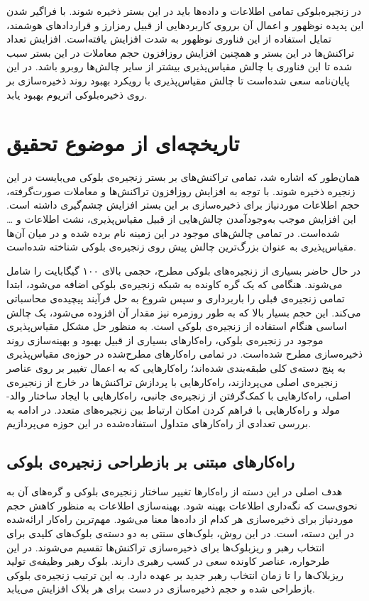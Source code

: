 در زنجیره‌بلوکی تمامی اطلاعات و داده‌ها باید در این بستر ذخیره شوند. با فراگیر شدن این پدیده نوظهور و اعمال آن برروی کاربردهایی از قبیل رمزارز و قراردادهای هوشمند، تمایل استفاده از این فناوری نوظهور به شدت افزایش یافته‌است. افزایش تعداد تراکنش‌ها در این بستر و همچنین افزایش روزافزون حجم معاملات در این بستر سبب شده تا این فناوری با چالش مقیاس‌پذیری بیشتر از سایر چالش‌ها روبرو باشد. در این پایان‌نامه سعی شده‌است تا چالش مقیاس‌پذیری با رویکرد بهبود روند ذخیره‌سازی بر روی ذخیره‌بلوکی اتریوم بهبود یابد.

\section{تاریخچه‌ای از موضوع تحقیق}
همان‌‌طور که اشاره شد، تمامی تراکنش‌های بر بستر زنجیره‌ی بلوکی می‌بایست در این زنجیره ذخیره شوند. با توجه به افزایش روزافزون تراکنش‌ها و معاملات صورت‌گرفته، حجم اطلاعات موردنیاز برای ذخیره‌سازی بر این بستر افزایش چشم‌گیری داشته است. این افزایش موجب به‌وجود‌آمدن چالش‌هایی از قبیل مقیاس‌پذیری، نشت اطلاعات و \dots شده‌است. در \cite{Lin2017}
تمامی چالش‌های موجود در این زمینه نام برده شده و در میان آن‌ها مقیاس‌پذیری به عنوان بزرگ‌ترین چالش پیش‌ روی زنجیر‌ه‌ی بلوکی شناخته شده‌است. 

در حال حاضر بسیاری از زنجیره‌های بلوکی مطرح، حجمی بالای ۱۰۰ گیگابایت را شامل می‌شوند. هنگامی که یک گره کاونده به شبکه زنجیره‌ی بلوکی اضافه می‌شود، ابتدا تمامی زنجیره‌ی قبلی را باربرداری و سپس شروع به حل فرآیند پیچیده‌ی محاسباتی می‌کند. این حجم بسیار بالا که به طور روزمره نیز مقدار آن افزوده می‌شود، یک چالش اساسی هنگام استفاده از زنجیره‌ی بلوکی است. \cite{Wang2018}
به منظور حل مشکل مقیاس‌پذیری موجود در زنجیره‌ی بلوکی، راه‌کارهای بسیاری از قبیل بهبود و بهینه‌سازی روند ذخیره‌سازی مطرح شده‌است.
در \cite{Kim2018} تمامی راه‌کارهای مطرح‌شده در حوزه‌ی مقیاس‌پذیری به پنج دسته‌ی کلی طبقه‌بندی شده‌اند؛ راه‌کارهایی که به اعمال تغییر بر روی عناصر زنجیره‌ی اصلی می‌پردازند، راه‌کارهایی با پردازش تراکنش‌ها در خارج از زنجیره‌ی اصلی، راه‌کارهایی با کمک‌گرفتن از زنجیره‌ی جانبی، راه‌کارهایی با ایجاد ساختار والد-مولد و راه‌کارهایی با فراهم کردن امکان ارتباط بین زنجیره‌های متعدد.
در ادامه به بررسی تعدادی از راه‌کارهای متداول استفاده‌شده در این حوزه می‌پردازیم.

\subsection{راه‌کارهای مبتنی بر بازطراحی زنجیره‌ی بلوکی}
هدف اصلی در این دسته از راه‌کارها تغییر ساختار زنجیره‌ی بلوکی و گره‌های آن به نحوی‌ست که نگه‌داری اطلاعات بهینه شود. بهینه‌سازی اطلاعات به منظور کاهش حجم موردنیاز برای ذخیره‌سازی هر کدام از داده‌ها معنا می‌شود. مهم‌ترین راه‌کار ارائه‌شده در این دسته، \cite{Eyal2015} است. در این روش، بلوک‌های سنتی به دو دسته‌ی بلوک‌های کلیدی برای انتخاب رهبر و ریزبلوک‌ها برای ذخیره‌سازی تراکنش‌ها تقسیم می‌شوند. در این طرحواره، عناصر کاونده سعی در کسب رهبری دارند. بلوک رهبر وظیفه‌ی تولید ریزبلاک‌ها را تا زمان انتخاب رهبر جدید بر عهده دارد. به این ترتیب زنجیره‌ی بلوکی بازطراحی شده و حجم ذخیره‌سازی در دست برای هر بلاک افزایش می‌یابد. 

